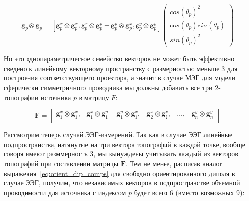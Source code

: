 \begin{equation*}
    \mathbf{g}_p \otimes \mathbf{g}_p =
    [\mathbf{g}_p^x \otimes \mathbf{g}_p^x, \mathbf{g}_p^x \otimes \mathbf{g}_p^y +
     \mathbf{g}_p^y \otimes \mathbf{g}_p^x, \mathbf{g}_p^y \otimes \mathbf{g}_p^y]
    \left( \begin{array}{ccc}
    cos(\theta_p)^2 \\
    cos(\theta_p) sin(\theta_p) \\
    sin(\theta_p)^2
    \end{array}
    \right)
\end{equation*}

Но это однопараметрическое семейство векторов не может быть эффективно сведено к линейному векторному
пространству с размерностью меньше 3 для построения соответствующего проектора,
а значит в случае МЭГ для модели сферически симметричного проводника мы должны добавить все три
2-топографии источника $p$ в матрицу $F$:

\begin{equation}
    \mathbf{F} =
    \begin{bmatrix}
        \mathbf{g}_1^x \otimes \mathbf{g}_1^x, &
        \mathbf{g}_1^x \otimes \mathbf{g}_1^y + \mathbf{g}_1^y \otimes \mathbf{g}_1^x, &
        \mathbf{g}_2^x \otimes \mathbf{g}_2^x, &
        \dots, & \mathbf{g}_n^y \otimes \mathbf{g}_n^y \\
    \end{bmatrix}
\end{equation}

Рассмотрим теперь случай ЭЭГ-измерений. Так как в случае ЭЭГ линейные подпространства, натянутые
на три вектора топографий в каждой точке, вообще говоря имеют разммерность 3, мы вынуждены
учитывать каждый из векторов топографий при составлении матрицы $\mathbf{F}$.
Тем не менее, расписав аналог выражения~\ref{eq:orient_dip_comps}
для свободно ориентированного диполя в случае ЭЭГ,
получим, что независимых векторов  в подпространстве объемной проводимости для источника с индексом $p$
будет всего 6 (вместо возможных 9):


